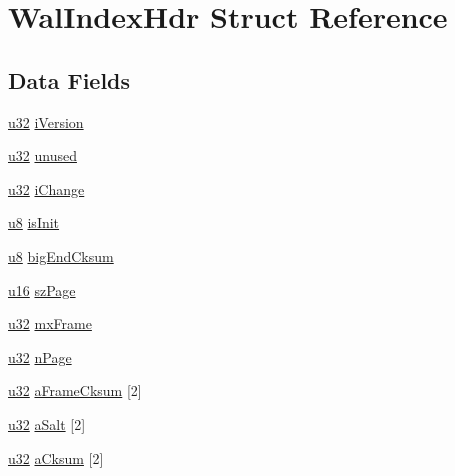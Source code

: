 \hypertarget{struct_wal_index_hdr}{}\section{Wal\+Index\+Hdr Struct Reference}
\label{struct_wal_index_hdr}
\subsection*{Data Fields}
\begin{DoxyCompactItemize}
\item 
\hyperlink{sqlite3_8c_a03ad5adfaeb9b7640dde78a0cc390319}{u32} \hyperlink{struct_wal_index_hdr_a95077ae3f44a9820e9304854bd6d832a}{i\+Version}
\item 
\hyperlink{sqlite3_8c_a03ad5adfaeb9b7640dde78a0cc390319}{u32} \hyperlink{struct_wal_index_hdr_a4884baf6a3e410b581a16e00353028b6}{unused}
\item 
\hyperlink{sqlite3_8c_a03ad5adfaeb9b7640dde78a0cc390319}{u32} \hyperlink{struct_wal_index_hdr_aa8471e66ae706687aabad217def07c91}{i\+Change}
\item 
\hyperlink{sqlite3_8c_a74a0f6424ae628af25f23f0a35f6ead3}{u8} \hyperlink{struct_wal_index_hdr_a7318e02c1fe25199c0198f703c630337}{is\+Init}
\item 
\hyperlink{sqlite3_8c_a74a0f6424ae628af25f23f0a35f6ead3}{u8} \hyperlink{struct_wal_index_hdr_ab1a5f50baf0ba086cabe461481d21b03}{big\+End\+Cksum}
\item 
\hyperlink{sqlite3_8c_a20f2299e322dcbde37cb07b16910b843}{u16} \hyperlink{struct_wal_index_hdr_ab53b7daf2abd446d856245f8a9c809b0}{sz\+Page}
\item 
\hyperlink{sqlite3_8c_a03ad5adfaeb9b7640dde78a0cc390319}{u32} \hyperlink{struct_wal_index_hdr_aec0fb4e633de5771ed7053861905c846}{mx\+Frame}
\item 
\hyperlink{sqlite3_8c_a03ad5adfaeb9b7640dde78a0cc390319}{u32} \hyperlink{struct_wal_index_hdr_a6b939842a27dd6c712b8a6f878bd0e89}{n\+Page}
\item 
\hyperlink{sqlite3_8c_a03ad5adfaeb9b7640dde78a0cc390319}{u32} \hyperlink{struct_wal_index_hdr_a051d00825e8208ac79cea1d0e3765729}{a\+Frame\+Cksum} \mbox{[}2\mbox{]}
\item 
\hyperlink{sqlite3_8c_a03ad5adfaeb9b7640dde78a0cc390319}{u32} \hyperlink{struct_wal_index_hdr_a4d22f22e15eb954f645220314c23166f}{a\+Salt} \mbox{[}2\mbox{]}
\item 
\hyperlink{sqlite3_8c_a03ad5adfaeb9b7640dde78a0cc390319}{u32} \hyperlink{struct_wal_index_hdr_a2a85ae431bbf2fbacddaded256af793d}{a\+Cksum} \mbox{[}2\mbox{]}
\end{DoxyCompactItemize}


